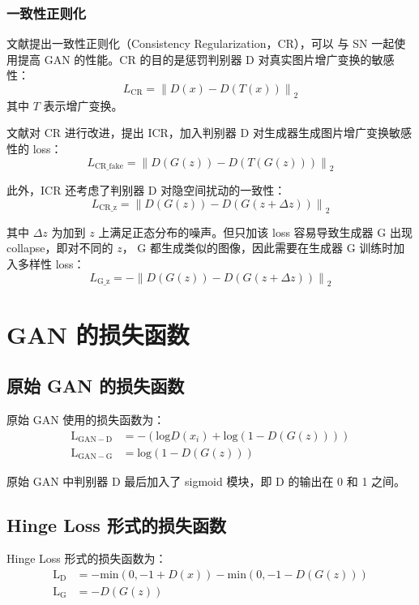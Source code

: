 \subsubsection{一致性正则化}
文献提出一致性正则化（Consistency Regularization，CR），可以
与 SN 一起使用提高 GAN 的性能。CR 的目的是惩罚判别器 D 对真实图片增广变换的敏感性：
\begin{equation}
  L_{\mathrm{CR}} = \left\| D(x) - D(T(x)) \right\|_2
\end{equation}
其中 $T$ 表示增广变换。

文献对 CR 进行改进，提出 ICR，加入判别器 D 对生成器生成图片增广变换敏感性的 loss：
\begin{equation}
  L_{\mathrm{CR\_fake}} = \left\| D(G(z)) - D(T(G(z))) \right\|_2
\end{equation}

此外，ICR 还考虑了判别器 D 对隐空间扰动的一致性：
\begin{equation}
  L_{\mathrm{CR\_z}} = \left\| D(G(z)) - D(G(z+\Delta z)) \right\|_2
\end{equation}

其中 $\Delta z$ 为加到 $z$ 上满足正态分布的噪声。但只加该 loss 容易导致生成器 G
出现 collapse，即对不同的 $z$， G 都生成类似的图像，因此需要在生成器 G 训练时加
入多样性 loss：
\begin{equation}
  L_{\mathrm{G\_z}} = -\left\| D(G(z)) - D(G(z+\Delta z)) \right\|_2
\end{equation}

\section{GAN 的损失函数}
\subsection{原始 GAN 的损失函数}
原始 GAN 使用的损失函数为：
\begin{align}
  \label{equ:origin-GAN-loss}
  \mathrm{L}_{\mathrm{GAN-D}} & = - \left( \mathrm{log} D(x_i) + \mathrm{log} (1-D(G(z))) \right ) \\
  \mathrm{L}_{\mathrm{GAN-G}} & = \mathrm{log} (1-D(G(z)))
\end{align}

原始 GAN 中判别器 D 最后加入了 sigmoid 模块，即 D 的输出在 0 和 1 之间。

\subsection{Hinge Loss 形式的损失函数}
Hinge Loss 形式的损失函数为：
\begin{align}
  \label{equ:origin-GAN-loss}
  \mathrm{L}_{\mathrm{D}} & = -\mathrm{min}(0, -1 + D(x)) - \mathrm{min}(0,
  -1-D(G(z))) \\
  \mathrm{L}_{\mathrm{G}} & = -D(G(z))
\end{align}

